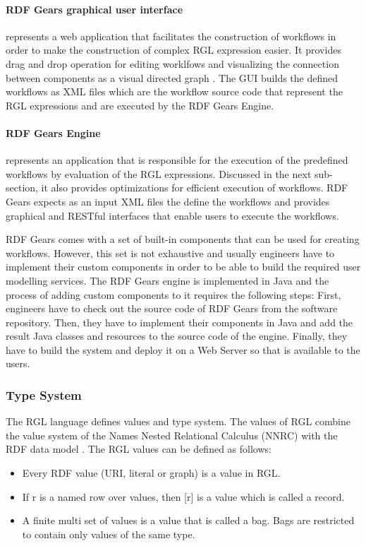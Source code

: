 \paragraph{RDF Gears graphical user interface} represents a web application that facilitates the construction of workflows in order to make the construction of complex RGL expression easier. It provides drag and drop operation for editing worklfows and visualizing the connection between components as a visual directed graph \cite{maro2011}. The GUI builds the defined workflows as XML files which are the workflow source code that represent the RGL expressions and are executed by the RDF Gears Engine.

\paragraph{RDF Gears Engine} represents an application that is responsible for the execution of the predefined workflows by evaluation of the RGL expressions. Discussed in the next sub-section, it also provides optimizations for efficient execution of workflows. RDF Gears expects as an input XML files the define the workflows and provides graphical and RESTful interfaces that enable users to execute the workflows. 

RDF Gears comes with a set of built-in components that can be used for creating workflows. However, this set is not exhaustive and usually engineers have to implement their custom components in order to be able to build the required user modelling services. The RDF Gears engine is implemented in Java and the process of adding custom components to it requires the following steps: First, engineers have to check out the source code of RDF Gears from the software repository. Then, they have to implement their components in Java and add the result Java classes and resources to the source code of the engine.  Finally, they have to build the system and deploy it on a Web Server so that is available to the users.

\subsubsection{Type System}

The RGL language defines values and type system. The values of RGL combine the value system of the Names Nested Relational Calculus (NNRC) with the RDF data model \cite{feliksik2011}. The RGL values can be defined as follows:

\begin{itemize}
	\item Every RDF value (URI, literal or graph) is a value in RGL.
	
	\item If r is a named row over values, then [r] is a value which is called a record.
	
	\item A finite multi set of values is a value that is called a bag. Bags are restricted to contain only values of the same type.
\end{itemize}

